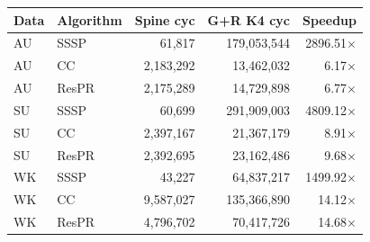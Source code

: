 \begin{tabular}{llrrr}
\toprule
Data & Algorithm & Spine cyc & G+R K4 cyc & Speedup \\
\midrule
AU & SSSP & 61,817 & 179,053,544 & 2896.51$\times$ \\
AU & CC & 2,183,292 & 13,462,032 & 6.17$\times$ \\
AU & ResPR & 2,175,289 & 14,729,898 & 6.77$\times$ \\
SU & SSSP & 60,699 & 291,909,003 & 4809.12$\times$ \\
SU & CC & 2,397,167 & 21,367,179 & 8.91$\times$ \\
SU & ResPR & 2,392,695 & 23,162,486 & 9.68$\times$ \\
WK & SSSP & 43,227 & 64,837,217 & 1499.92$\times$ \\
WK & CC & 9,587,027 & 135,366,890 & 14.12$\times$ \\
WK & ResPR & 4,796,702 & 70,417,726 & 14.68$\times$ \\
\bottomrule
\end{tabular}
